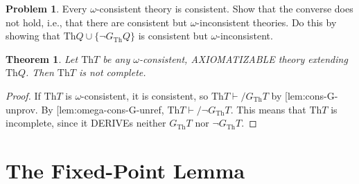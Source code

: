 \documentclass[10pt,a4paper]{article}
\makeatletter
\newcommand*{\olup}[1]{\MakeUppercase{#1}}
\theoremstyle{plain}
\newtheorem{thm}{Theorem}[section]
\theoremstyle{definition}
\newtheorem{prob}{Problem}[section]
\theoremstyle{remark}
\newcommand*{\olfileid}[3]{}
\newcommand*{\olsection}[1]{\section*{#1}}
\newcommand*{\ollabel}[1]{\label{#1}}
\newcommand{\olref}{\@ifnextchar[{\olref@i}{\olref@final}}
\def\olref@i[#1]{\@ifnextchar[{\olref@ii}{\olref@final}}
\def\olref@ii[#1]{\@ifnextchar[{\olref@iii}{\olref@final}}
\def\olref@iii[#1]{\olref@final}
\def\olref@final#1{\ref{#1}}
\providecommand{\Proves}{\mathrel{\vdash}}
\providecommand{\Th}{\ensuremath{\mathrm{Th}}}
\makeatother
\begin{document}
\begin{prob}
  Every $\omega$-consistent theory is consistent. Show that the
  converse does not hold, i.e., that there are consistent but
  $\omega$-inconsistent theories. Do this by showing that $\Th{Q} \cup
  \{\lnot G_\Th{Q}\}$ is consistent but $\omega$-inconsistent.
\end{prob}

\begin{thm}
\ollabel{thm:first-incompleteness} Let $\Th{T}$ be any
$\omega$-consistent, \olup{axiomatizable} theory extending~$\Th{Q}$. Then
$\Th{T}$ is not complete.
\end{thm}

\begin{proof}
  If $\Th{T}$ is $\omega$-consistent, it is consistent, so $\Th{T}
  \Proves/ G_\Th{T}$ by \olref{lem:cons-G-unprov}.  By
  \olref{lem:omega-cons-G-unref}, $\Th{T} \Proves/ \lnot G_\Th{T}$.
  This means that $\Th{T}$ is incomplete, since it \olup{derive}s neither
  $G_\Th{T}$ nor $\lnot G_\Th{T}$.
\end{proof}





\olfileid{inc}{inp}{fix}

\olsection{The Fixed-Point Lemma}
\end{document}
